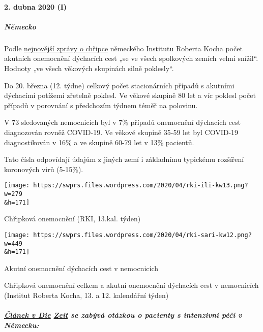\hypertarget{2-dubna-2020-i}{%
\paragraph{2. dubna 2020 (I)}\label{2-dubna-2020-i}}

\hypertarget{nux11bmecko}{%
\subparagraph{\texorpdfstring{\textbf{Německo}}{Německo}}\label{nux11bmecko}}

Podle
\href{https://influenza.rki.de/Wochenberichte/2019_2020/2020-13.pdf}{nejnovější
zprávy o chřipce} německého Institutu Roberta Kocha počet akutních
onemocnění dýchacích cest „se ve všech spolkových zemích velmi snížil``.
Hodnoty „ve všech věkových skupinách silně poklesly``.

Do 20. března (12. týdne) celkový počet stacionárních případů s akutními
dýchacími potížemi zřetelně poklesl. Ve věkové skupině 80 let a víc
poklesl počet případů v porovnání s předchozím týdnem téměř na polovinu.

V 73 sledovaných nemocnicích byl v 7\% případů onemocnění dýchacích cest
diagnozován rovněž COVID-19. Ve věkové skupině 35-59 let byl COVID-19
diagnostikován v 16\% a ve skupině 60-79 let v 13\% pacientů.

Tato čísla odpovídají údajům z jiných zemí i základnímu typickému
rozšíření koronových virů (5-15\%).

\href{https://swprs.files.wordpress.com/2020/04/rki-ili-kw13.png}{}

\texttt{[image: https://swprs.files.wordpress.com/2020/04/rki-ili-kw13.png?w=279\\\&h=171]}

Chřipková onemocnění (RKI, 13.kal. týden)

\href{https://swprs.files.wordpress.com/2020/04/rki-sari-kw12.png}{}

\texttt{[image: https://swprs.files.wordpress.com/2020/04/rki-sari-kw12.png?w=449\\\&h=171]}

Akutní onemocnění dýchacích cest v nemocnicích

Chřipková onemocnění celkem a akutní onemocnění dýchacích cest v
nemocnicích (Institut Roberta Kocha, 13. a 12. kalendářní týden)

\hypertarget{ux10dluxe1nek-v-die-zeit-se-zabuxfdvuxe1-otuxe1zkou-o-pacienty-s-intenzivnuxed-puxe9ux10duxed-v-nux11bmecku}{%
\subparagraph{\texorpdfstring{\href{https://www.zeit.de/wissen/2020-04/krankenhaeuser-kapazitaeten-coronavirus-patienten-deutschland/seite-2\%20/t\%20_blank}{Článek
v Die}
\href{https://www.zeit.de/wissen/2020-04/krankenhaeuser-kapazitaeten-coronavirus-patienten-deutschland/seite-2\%20/t\%20_blank}{Zeit}
se zabývá otázkou o pacienty s intenzivní péčí v
Německu:}{Článek v Die Zeit se zabývá otázkou o pacienty s intenzivní péčí v Německu:}}\label{ux10dluxe1nek-v-die-zeit-se-zabuxfdvuxe1-otuxe1zkou-o-pacienty-s-intenzivnuxed-puxe9ux10duxed-v-nux11bmecku}}


